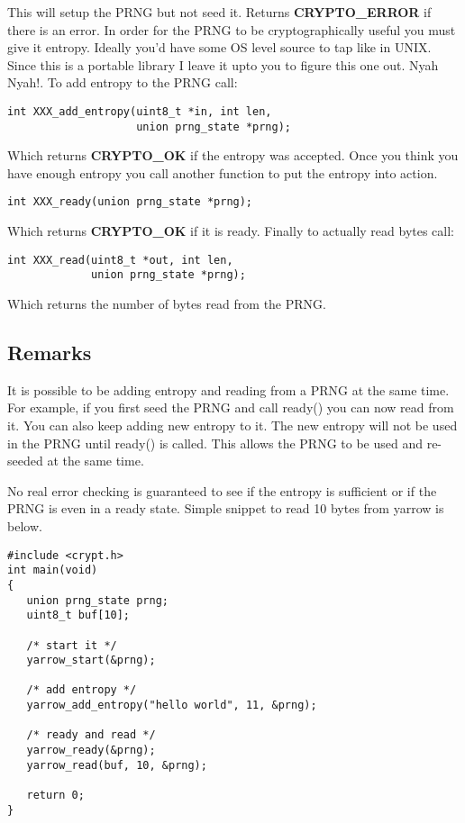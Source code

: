 \documentclass{book}
\begin{document}
This will setup the PRNG but not seed it.  Returns {\bf CRYPTO\_ERROR} if there is an error.  In order for the PRNG to be 
cryptographically useful you must give it entropy.  Ideally you'd have some OS level source to tap like in UNIX.  Since 
this is a portable library I leave it upto you to figure this one out.  Nyah Nyah!.  To add entropy to the PRNG call:
\begin{verbatim}
int XXX_add_entropy(uint8_t *in, int len, 
                    union prng_state *prng);
\end{verbatim}

Which returns {\bf CRYPTO\_OK} if the entropy was accepted.  Once you think you have enough entropy you call another
function to put the entropy into action.
\begin{verbatim}
int XXX_ready(union prng_state *prng);
\end{verbatim}

Which returns {\bf CRYPTO\_OK} if it is ready.  Finally to actually read bytes call:
\begin{verbatim}
int XXX_read(uint8_t *out, int len,
             union prng_state *prng);
\end{verbatim}

Which returns the number of bytes read from the PRNG.

\subsection{Remarks}

It is possible to be adding entropy and reading from a PRNG at the same time.  For example, if you first seed the PRNG
and call ready() you can now read from it.  You can also keep adding new entropy to it.  The new entropy will not be used
in the PRNG until ready() is called.  This allows the PRNG to be used and re-seeded at the same time.

No real error checking is guaranteed to see if the entropy is sufficient or if the PRNG is even in a ready state.  Simple
snippet to read 10 bytes from yarrow is below.

\begin{verbatim}
#include <crypt.h>
int main(void)
{
   union prng_state prng;
   uint8_t buf[10];

   /* start it */
   yarrow_start(&prng);

   /* add entropy */
   yarrow_add_entropy("hello world", 11, &prng);
 
   /* ready and read */
   yarrow_ready(&prng);
   yarrow_read(buf, 10, &prng);

   return 0;
}
\end{verbatim}
\end{document}
